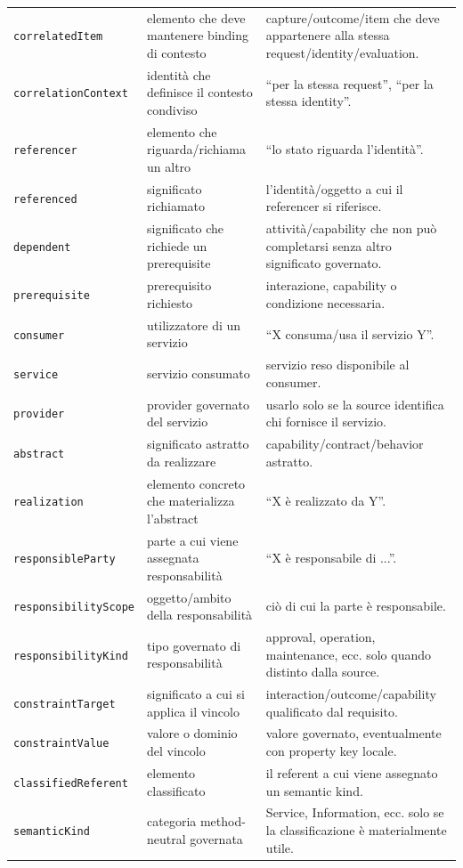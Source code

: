 \documentclass[11pt,a4paper]{article}
\newcommand{\code}[1]{\nolinkurl{#1}}
\begin{document}
\begin{longtable}{L{0.28\textwidth}L{0.25\textwidth}L{0.33\textwidth}}
\code{correlatedItem} & elemento che deve mantenere binding di contesto & capture/outcome/item che deve appartenere alla stessa request/identity/evaluation. \\
\code{correlationContext} & identità che definisce il contesto condiviso & ``per la stessa request'', ``per la stessa identity''. \\
\code{referencer} & elemento che riguarda/richiama un altro & ``lo stato riguarda l'identità''. \\
\code{referenced} & significato richiamato & l'identità/oggetto a cui il referencer si riferisce. \\
\code{dependent} & significato che richiede un prerequisite & attività/capability che non può completarsi senza altro significato governato. \\
\code{prerequisite} & prerequisito richiesto & interazione, capability o condizione necessaria. \\
\code{consumer} & utilizzatore di un servizio & ``X consuma/usa il servizio Y''. \\
\code{service} & servizio consumato & servizio reso disponibile al consumer. \\
\code{provider} & provider governato del servizio & usarlo solo se la source identifica chi fornisce il servizio. \\
\code{abstract} & significato astratto da realizzare & capability/contract/behavior astratto. \\
\code{realization} & elemento concreto che materializza l'abstract & ``X è realizzato da Y''. \\
\code{responsibleParty} & parte a cui viene assegnata responsabilità & ``X è responsabile di ...''. \\
\code{responsibilityScope} & oggetto/ambito della responsabilità & ciò di cui la parte è responsabile. \\
\code{responsibilityKind} & tipo governato di responsabilità & approval, operation, maintenance, ecc. solo quando distinto dalla source. \\
\code{constraintTarget} & significato a cui si applica il vincolo & interaction/outcome/capability qualificato dal requisito. \\
\code{constraintValue} & valore o dominio del vincolo & valore governato, eventualmente con property key locale. \\
\code{classifiedReferent} & elemento classificato & il referent a cui viene assegnato un semantic kind. \\
\code{semanticKind} & categoria method-neutral governata & Service, Information, ecc. solo se la classificazione è materialmente utile. \\
\bottomrule
\end{longtable}
\end{document}
